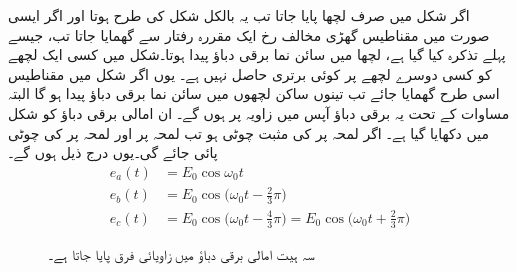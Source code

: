 اگر شکل  میں صرف لچھا  پایا جاتا تب یہ بالکل شکل    کی طرح ہوتا اور اگر ایسی صورت  میں مقناطیس  گھڑی   مخالف رخ ایک مقررہ رفتار  سے گھمایا جاتا تب، جیسے پہلے تذکرہ کیا گیا ہے، لچھا  میں سائن نما برقی دباؤ پیدا ہوتا۔شکل   میں کسی ایک لچھے کو کسی دوسرے لچھے پر کوئی برتری حاصل نہیں ہے۔ یوں اگر شکل   میں  مقناطیس اسی طرح گھمایا جائے تب  تینوں ساکن لچھوں میں سائن نما برقی دباؤ پیدا ہو گا البتہ مساوات     کے تحت یہ برقی دباؤ آپس میں    زاویہ پر ہوں گے۔ ان امالی برقی دباؤ کو شکل  میں دکھایا گیا ہے۔ اگر لمحہ  پر    کی مثبت چوٹی ہو تب لمحہ  پر   اور لمحہ  پر  کی چوٹی پائی جائے گی۔یوں درج ذیل ہوں گے۔
\begin{align*}
e_a(t)&=E_0\cos \omega_0 t\\
e_b(t)&=E_0\cos\big(\omega_0 t-\frac{2}{3}\pi\big)\\
e_c(t)&=E_0\cos\big(\omega_0 t-\frac{4}{3}\pi\big)=E_0\cos\big(\omega_0 t+\frac{2}{3}\pi\big)
\end{align*}
%
\begin{figure}
\centering
{}
\caption{سہ ہیت امالی برقی دباؤ میں زاویائی فرق پایا جاتا ہے۔}
\label{شکل_گھومتے_مشین_اصول_تین_دوری_امالی_دباو}
\end{figure}


